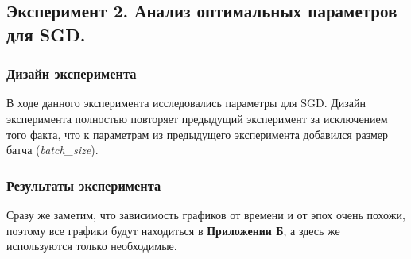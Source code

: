 \subsection{Эксперимент 2. Анализ оптимальных  параметров для SGD.}
\subsubsection{Дизайн эксперимента}
В ходе данного эксперимента исследовались параметры для SGD. Дизайн эксперимента полностью повторяет предыдущий эксперимент за исключением того факта, что к параметрам из предыдущего эксперимента добавился размер батча  ({\itshape batch\_size}). 
\subsubsection{Результаты эксперимента}
Сразу же заметим, что зависимость графиков от времени и от эпох очень похожи, поэтому все графики будут находиться в  {\bfseries Приложении Б}, а здесь же используются только необходимые.
